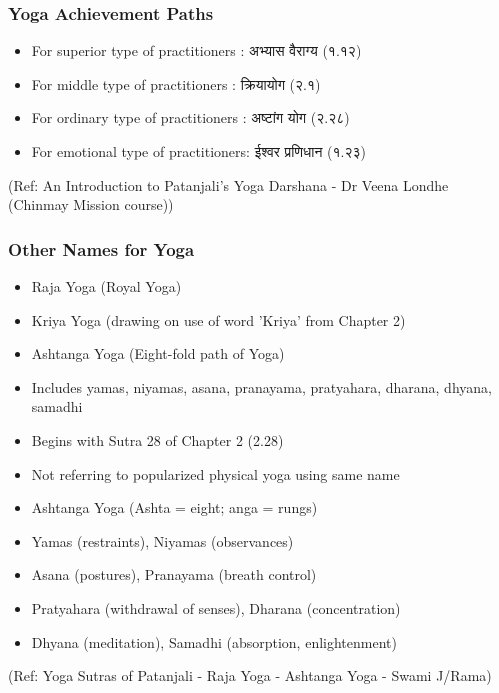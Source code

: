 \begin{frame}[fragile]\frametitle{Yoga Achievement Paths}

\begin{itemize}
\item For superior type of practitioners : अभ्यास  वैराग्य (१.१२)
\item For middle type of practitioners : क्रियायोग (२.१)
\item For ordinary type of practitioners : अष्टांग योग (२.२८)
\item For emotional type of practitioners: ईश्वर प्रणिधान  (१.२३)
\end{itemize}
  
  \tiny{(Ref: An Introduction to Patanjali’s Yoga Darshana - Dr Veena Londhe (Chinmay Mission course))}

\end{frame}


\begin{frame}[fragile]\frametitle{Other Names for Yoga}
\begin{itemize}
\item Raja Yoga (Royal Yoga)
\item Kriya Yoga (drawing on use of word 'Kriya' from Chapter 2)
\item Ashtanga Yoga (Eight-fold path of Yoga)
\item Includes yamas, niyamas, asana, pranayama, pratyahara, dharana, dhyana, samadhi
\item Begins with Sutra 28 of Chapter 2 (2.28)
\item Not referring to popularized physical yoga using same name
\item Ashtanga Yoga (Ashta = eight; anga = rungs)
\item Yamas (restraints), Niyamas (observances)
\item Asana (postures), Pranayama (breath control)
\item Pratyahara (withdrawal of senses), Dharana (concentration)
\item Dhyana (meditation), Samadhi (absorption, enlightenment)
\end{itemize}
  
  \tiny{(Ref: Yoga Sutras of Patanjali - Raja Yoga - Ashtanga Yoga - Swami J/Rama)}

\end{frame}

